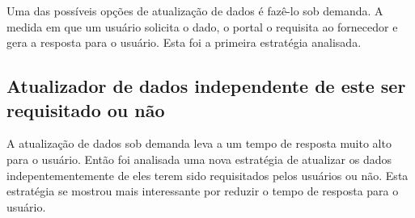 Uma das possíveis opções de atualização de dados é fazê-lo sob demanda. A medida em que um usuário solicita o dado, o portal o requisita ao fornecedor e gera a resposta para o usuário. Esta foi a primeira estratégia analisada.

\subsection{Atualizador de dados independente de este ser requisitado ou não}

A atualização de dados sob demanda leva a um tempo de resposta muito alto para o usuário. Então foi analisada uma nova estratégia de atualizar os dados indepentementemente de eles terem sido requisitados pelos usuários ou não. Esta estratégia se mostrou mais interessante por reduzir o tempo de resposta para o usuário.

